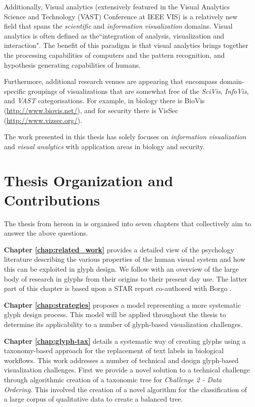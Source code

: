 Additionally, Visual analytics (extensively featured in the Visual Analytics Science and Technology (VAST) Conference at IEEE VIS) is a relatively new field that spans the \emph{scientific} and \emph{information visualization} domains.
Visual analytics is often defined as the``integration of analysis, visualization and interaction".
The benefit of this paradigm is that visual analytics brings together the processing capabilities of computers and the pattern recognition, and hypothesis generating capabilities of humans.


Furthermore, additional research venues are appearing that encompass domain-specific groupings of visualizations that are somewhat free of the \emph{SciVis}, \emph{InfoVis}, and \emph{VAST} categorisations.
For example, in biology there is BioVis (\url{http://www.biovis.net/}), and for security there is VisSec (\url{http://www.vizsec.org/}).

The work presented in this thesis has solely focuses on \emph{information visualization} and \emph{visual analytics} with application areas in biology and security.

\section{Thesis Organization and Contributions}
The thesis from hereon in is organised into seven chapters that collectively aim to answer the above questions. 

\textbf{Chapter \ref{chap:related_work}} provides a detailed view of the psychology literature describing the various properties of the human visual system and how this can be exploited in glyph design.
We follow with an overview of the large body of research in glyphs from their origins to their present day use.
The latter part of this chapter is based upon a STAR report co-authored with Borgo \etal \cite{Borgo:2013:EG}. 

\textbf{Chapter \ref{chap:strategies}} proposes a model representing a more systematic glyph design process.
This model will be applied throughout the thesis to determine its applicability to a number of glyph-based visualization challenges.

\textbf{Chapter \ref{chap:glyph-tax}} details a systematic way of creating glyphs using a taxonomy-based approach for the replacement of text labels in biological workflows. 
This work addresses a number of technical and design glyph-based visualization challenges.
First we provide a novel solution to a technical challenge through algorithmic creation of a taxonomic tree for \emph{Challenge 2 - Data Ordering}.
This involved the creation of a novel algorithm for the classification of a large corpus of qualitative data to create a balanced tree.

